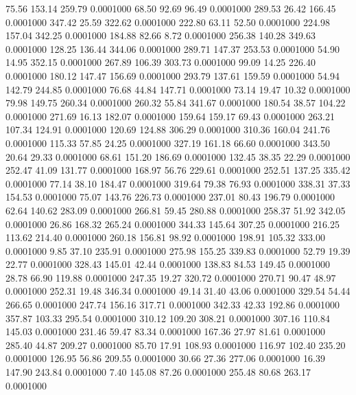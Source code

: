   75.56  153.14  259.79   0.0001000
  68.50   92.69   96.49   0.0001000
 289.53   26.42  166.45   0.0001000
 347.42   25.59  322.62   0.0001000
 222.80   63.11   52.50   0.0001000
 224.98  157.04  342.25   0.0001000
 184.88   82.66    8.72   0.0001000
 256.38  140.28  349.63   0.0001000
 128.25  136.44  344.06   0.0001000
 289.71  147.37  253.53   0.0001000
  54.90   14.95  352.15   0.0001000
 267.89  106.39  303.73   0.0001000
  99.09   14.25  226.40   0.0001000
 180.12  147.47  156.69   0.0001000
 293.79  137.61  159.59   0.0001000
  54.94  142.79  244.85   0.0001000
  76.68   44.84  147.71   0.0001000
  73.14   19.47   10.32   0.0001000
  79.98  149.75  260.34   0.0001000
 260.32   55.84  341.67   0.0001000
 180.54   38.57  104.22   0.0001000
 271.69   16.13  182.07   0.0001000
 159.64  159.17   69.43   0.0001000
 263.21  107.34  124.91   0.0001000
 120.69  124.88  306.29   0.0001000
 310.36  160.04  241.76   0.0001000
 115.33   57.85   24.25   0.0001000
 327.19  161.18   66.60   0.0001000
 343.50   20.64   29.33   0.0001000
  68.61  151.20  186.69   0.0001000
 132.45   38.35   22.29   0.0001000
 252.47   41.09  131.77   0.0001000
 168.97   56.76  229.61   0.0001000
 252.51  137.25  335.42   0.0001000
  77.14   38.10  184.47   0.0001000
 319.64   79.38   76.93   0.0001000
 338.31   37.33  154.53   0.0001000
  75.07  143.76  226.73   0.0001000
 237.01   80.43  196.79   0.0001000
  62.64  140.62  283.09   0.0001000
 266.81   59.45  280.88   0.0001000
 258.37   51.92  342.05   0.0001000
  26.86  168.32  265.24   0.0001000
 344.33  145.64  307.25   0.0001000
 216.25  113.62  214.40   0.0001000
 260.18  156.81   98.92   0.0001000
 198.91  105.32  333.00   0.0001000
   9.85   37.10  235.91   0.0001000
 275.98  155.25  339.83   0.0001000
  52.79   19.39   22.77   0.0001000
 328.43  145.01   42.44   0.0001000
 138.83   84.53  149.45   0.0001000
  28.78   66.90  119.88   0.0001000
 247.35   19.27  320.72   0.0001000
 270.71   90.47   48.97   0.0001000
 252.31   19.48  346.34   0.0001000
  49.14   31.40   43.06   0.0001000
 329.54   54.44  266.65   0.0001000
 247.74  156.16  317.71   0.0001000
 342.33   42.33  192.86   0.0001000
 357.87  103.33  295.54   0.0001000
 310.12  109.20  308.21   0.0001000
 307.16  110.84  145.03   0.0001000
 231.46   59.47   83.34   0.0001000
 167.36   27.97   81.61   0.0001000
 285.40   44.87  209.27   0.0001000
  85.70   17.91  108.93   0.0001000
 116.97  102.40  235.20   0.0001000
 126.95   56.86  209.55   0.0001000
  30.66   27.36  277.06   0.0001000
  16.39  147.90  243.84   0.0001000
   7.40  145.08   87.26   0.0001000
 255.48   80.68  263.17   0.0001000
